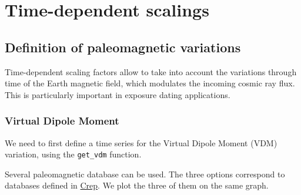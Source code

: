\documentclass[
]{book}
\begin{document}
\hypertarget{time-dependent-scalings}{%
\section{Time-dependent scalings}\label{time-dependent-scalings}}

\hypertarget{definition-of-paleomagnetic-variations}{%
\subsection{Definition of paleomagnetic variations}\label{definition-of-paleomagnetic-variations}}

Time-dependent scaling factors allow to take into account the variations through time of the Earth magnetic field, which modulates the incoming cosmic ray flux. This is particularly important in exposure dating applications.

\hypertarget{virtual-dipole-moment}{%
\subsubsection{Virtual Dipole Moment}\label{virtual-dipole-moment}}

We need to first define a time series for the Virtual Dipole Moment (VDM) variation, using the \texttt{get\_vdm} function.

Several paleomagnetic database can be used.
The three options correspond to databases defined in \href{https://crep.otelo.univ-lorraine.fr}{Crep}.
We plot the three of them on the same graph.
\end{document}

